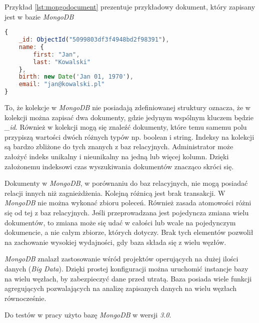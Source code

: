 Przykład \ref{lst:mongodocument} prezentuje przykładowy dokument, który zapisany jest w bazie \textsl{MongoDB}

\begin{lstlisting}[language=JavaScript,caption=Przykład dokumentu zapisanego w bazie MongoDB,label={lst:mongodocument}]
{
    _id: ObjectId("5099803df3f4948bd2f98391"),
    name: { 
        first: "Jan", 
        last: "Kowalski" 
    },
    birth: new Date('Jan 01, 1970'),
    email: "jan@kowalski.pl"
}
\end{lstlisting}

To, że kolekcje w \textsl{MongoDB} nie posiadają zdefiniowanej struktury oznacza, że w kolekcji można zapisać dwa dokumenty, gdzie jedynym wspólnym kluczem będzie \textsl{\_id}. Również w kolekcji mogą się znaleźć dokumenty, które temu samemu polu przypiszą wartości dwóch różnych typów np. boolean i string. Indeksy na kolekcji są bardzo zbliżone do tych znanych z baz relacyjnych. Administrator może założyć indeks unikalny i nieunikalny na jedną lub więcej kolumn. Dzięki założonemu indeksowi czas wyszukiwania dokumentów znacząco skróci się.

Dokumenty w \textsl{MongoDB}, w porównaniu do baz relacyjnych, nie mogą posiadać relacji innych niż zagnieżdżenia. Kolejną różnicą jest brak transakcji. W \textsl{MongoDB} nie można wykonać zbioru poleceń. Również zasada atomowości różni się od tej z baz relacyjnych. Jeśli przeprowadzana jest pojedyncza zmiana wielu dokumentów, to zmiana może się udać w całości lub wcale na pojedynczym dokumencie, a nie całym zbiorze, których dotyczy. Brak tych elementów pozwolił na zachowanie wysokiej wydajności, gdy baza składa się z wielu węzłów.

\textsl{MongoDB} znalazł zastosowanie wśród projektów operujących na dużej ilości danych (\textsl{Big Data}). Dzięki prostej konfiguracji można uruchomić instancje bazy na wielu węzłach, by zabezpieczyć dane przed utratą. Baza posiada wiele funkcji agregujących pozwalających na analizę zapisanych danych na wielu węzłach równocześnie. 

Do testów w pracy użyto bazę \textsl{MongoDB} w wersji \textsl{3.0}.


